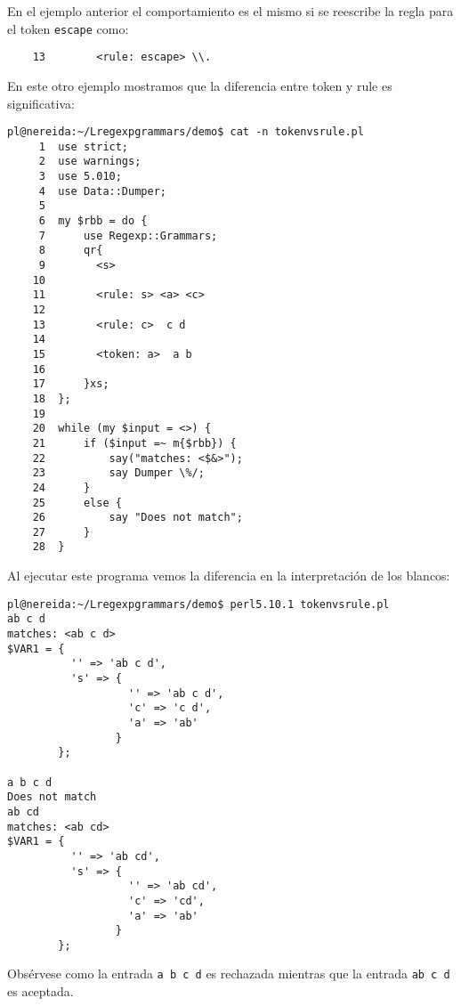 En el ejemplo anterior el comportamiento es el mismo si se reescribe la regla 
para el token \verb|escape| como:
\begin{verbatim}
    13        <rule: escape> \\.
\end{verbatim}
En este otro ejemplo mostramos que la diferencia entre token y rule
es significativa:
\begin{verbatim}
pl@nereida:~/Lregexpgrammars/demo$ cat -n tokenvsrule.pl
     1  use strict;
     2  use warnings;
     3  use 5.010;
     4  use Data::Dumper;
     5
     6  my $rbb = do {
     7      use Regexp::Grammars;
     8      qr{
     9        <s>
    10
    11        <rule: s> <a> <c>
    12
    13        <rule: c>  c d
    14
    15        <token: a>  a b
    16
    17      }xs;
    18  };
    19
    20  while (my $input = <>) {
    21      if ($input =~ m{$rbb}) {
    22          say("matches: <$&>");
    23          say Dumper \%/;
    24      }
    25      else {
    26          say "Does not match";
    27      }
    28  }
\end{verbatim}

Al ejecutar este programa vemos la diferencia en la interpretación de los blancos:
\begin{verbatim}
pl@nereida:~/Lregexpgrammars/demo$ perl5.10.1 tokenvsrule.pl
ab c d
matches: <ab c d>
$VAR1 = {
          '' => 'ab c d',
          's' => {
                   '' => 'ab c d',
                   'c' => 'c d',
                   'a' => 'ab'
                 }
        };

a b c d
Does not match
ab cd
matches: <ab cd>
$VAR1 = {
          '' => 'ab cd',
          's' => {
                   '' => 'ab cd',
                   'c' => 'cd',
                   'a' => 'ab'
                 }
        };
\end{verbatim}
Obsérvese como la entrada \verb|a b c d| es rechazada mientras
que la entrada \verb|ab c d| es aceptada.


